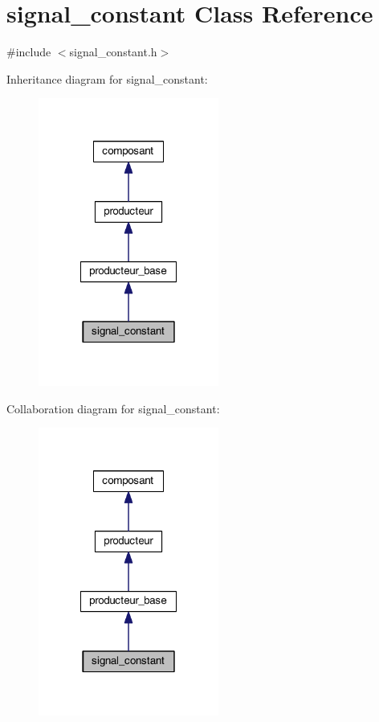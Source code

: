 \hypertarget{classsignal__constant}{\section{signal\-\_\-constant Class Reference}
\label{classsignal__constant}
}


{\ttfamily \#include $<$signal\-\_\-constant.\-h$>$}



Inheritance diagram for signal\-\_\-constant\-:
\nopagebreak
\begin{figure}[H]
\begin{center}
\leavevmode
\includegraphics[width=168pt]{classsignal__constant__inherit__graph}
\end{center}
\end{figure}


Collaboration diagram for signal\-\_\-constant\-:
\nopagebreak
\begin{figure}[H]
\begin{center}
\leavevmode
\includegraphics[width=168pt]{classsignal__constant__coll__graph}
\end{center}
\end{figure}
